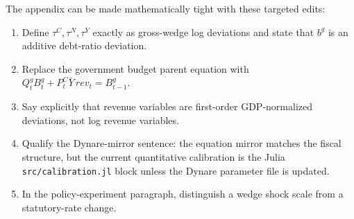 \documentclass[11pt]{article}
\newcommand{\tauc}{\tau^C}
\newcommand{\taun}{\tau^N}
\newcommand{\tauy}{\tau^Y}
\newcommand{\bg}{b^g}
\newcommand{\Pc}{P^C}
\begin{document}
The appendix can be made mathematically tight with these targeted edits:
\begin{enumerate}
  \item Define \(\tauc,\taun,\tauy\) exactly as gross-wedge log deviations and
  state that \(\bg\) is an additive debt-ratio deviation.
  \item Replace the government budget parent equation with
  \(Q^g_tB^g_t+\Pc_t\bar Y\,rev_t=B^g_{t-1}\).
  \item Say explicitly that revenue variables are first-order GDP-normalized
  deviations, not log revenue variables.
  \item Qualify the Dynare-mirror sentence: the equation mirror matches the
  fiscal structure, but the current quantitative calibration is the Julia
  \texttt{src/calibration.jl} block unless the Dynare parameter file is updated.
  \item In the policy-experiment paragraph, distinguish a wedge shock scale
  from a statutory-rate change.
\end{enumerate}
\end{document}
